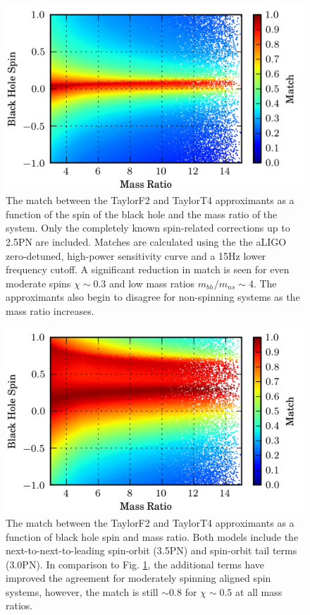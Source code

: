 \begin{figure}
\begin{center}
\includegraphics[width=1.0	\textwidth]{papers/nsbh_faithfulness/figure2.png}
\end{center}
\caption{\label{fig:f2f4f}The match between the TaylorF2 and
TaylorT4 approximants as a function of the spin of the black hole
and the mass ratio of the system. Only the completely known 
spin-related corrections up to 2.5\ac{PN} are included. Matches are calculated using the
the aLIGO zero-detuned, high-power sensitivity curve and a 15Hz lower frequency cutoff.
A significant reduction in match is seen for even moderate spins $\chi \sim 0.3$
and low mass ratios $m_{bh}/m_{ns} \sim 4$. The approximants also begin to disagree for non-spinning
systems as the mass ratio increases.
}


\end{figure}

\begin{figure}
\begin{center}
\includegraphics[width=1.0	\textwidth]{papers/nsbh_faithfulness/figure3.png}
\end{center}
\caption{\label{fig:f2t4fso}The match between the TaylorF2 and TaylorT4 approximants
as a function of black hole spin and mass ratio. Both models include
the next-to-next-to-leading spin-orbit (3.5\ac{PN}) and spin-orbit tail 
terms (3.0\ac{PN}). In comparison to Fig. \ref{fig:f2f4f}, the additional terms have 
improved the agreement for moderately spinning aligned spin systems, however, the
match is still $ \sim 0.8 $ for $\chi \sim 0.5 $ at all mass ratios.}

\end{figure}

